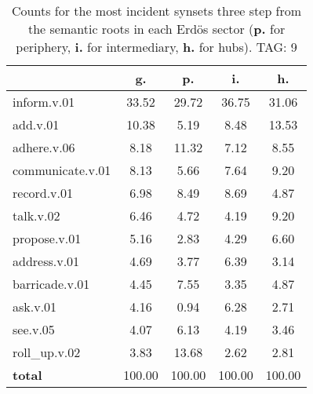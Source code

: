 \begin{table}[h!]
\begin{center}
\begin{tabular}{| l || c | c | c | c |}\hline
 & {\bf g.} & {\bf p.} & {\bf i.} & {\bf h.} \\\hline\hline
inform.v.01 & 33.52  & 29.72  & 36.75  & 31.06 \\\hline
add.v.01 & 10.38  & 5.19  & 8.48  & 13.53 \\\hline
adhere.v.06 & 8.18  & 11.32  & 7.12  & 8.55 \\\hline
communicate.v.01 & 8.13  & 5.66  & 7.64  & 9.20 \\\hline
record.v.01 & 6.98  & 8.49  & 8.69  & 4.87 \\\hline
talk.v.02 & 6.46  & 4.72  & 4.19  & 9.20 \\\hline
propose.v.01 & 5.16  & 2.83  & 4.29  & 6.60 \\\hline
address.v.01 & 4.69  & 3.77  & 6.39  & 3.14 \\\hline
barricade.v.01 & 4.45  & 7.55  & 3.35  & 4.87 \\\hline
ask.v.01 & 4.16  & 0.94  & 6.28  & 2.71 \\\hline
see.v.05 & 4.07  & 6.13  & 4.19  & 3.46 \\\hline
roll\_up.v.02 & 3.83  & 13.68  & 2.62  & 2.81 \\\hline\hline
{{\bf total}} & 100.00  & 100.00  & 100.00  & 100.00 \\\hline
\end{tabular}
\caption{Counts for the most incident synsets three step from the semantic roots in each Erd\"os sector ({\bf p.} for periphery, {\bf i.} for intermediary, {\bf h.} for hubs). TAG: 9}
\end{center}
\end{table}